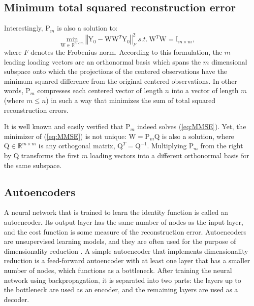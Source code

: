 \subsection{Minimum total squared reconstruction error}
Interestingly, $\text{P}_m$ is also a solution to:
\begin{equation}
\underset{\text{W} \in \mathbb{R}^{n \times m}}{\text{min}}{~\left\Vert \text{Y}_0-\text{W} \text{W}^T \text{Y}_0 \right\Vert_F^2}~s.t.~ \text{W}^T \text{W} = \text{I}_{m \times m},
\label{eq:MMSE}
\end{equation}
where $F$ denotes the Frobenius norm. According to this formulation, the $m$ leading loading vectors are an orthonormal basis which spans the $m$ dimensional subspace onto which the projections of the centered observations have the minimum squared difference from the original centered observations. In other words, $\text{P}_m$ compresses each centered vector of length $n$ into a vector of length $m$ (where $m \leq n$) in such a way that minimizes the sum of total squared reconstruction errors.

It is well known \cite{EckardtYoung} and easily verified that $\text{P}_m$ indeed solves (\ref{eq:MMSE}). Yet, the minimizer of (\ref{eq:MMSE}) is not unique: $\text{W} = \text{P}_m \text{Q}$ is also a solution, where $\text{Q} \in \mathbb{R}^{m \times m}$ is any orthogonal matrix, $\text{Q}^T = \text{Q}^{-1}$. Multiplying $\text{P}_m$ from the right by $\text{Q}$ transforms the first $m$ loading vectors into a different orthonormal basis for the same subspace.

\subsection{Autoencoders}
A neural network that is trained to learn the identity function is called an autoencoder. Its output layer has the same number of nodes as the input layer, and the cost function is some measure of the reconstruction error. Autoencoders are unsupervised learning models, and they are often used for the purpose of dimensionality reduction \cite{Dimreduction}. A simple autoencoder that implements dimensionality reduction is a feed-forward autoencoder with at least one layer that has a smaller number of nodes, which functions as a bottleneck. After training the neural network using backpropagation, it is separated into two parts: the layers up to the bottleneck are used as an encoder, and the remaining layers are used as a decoder.

